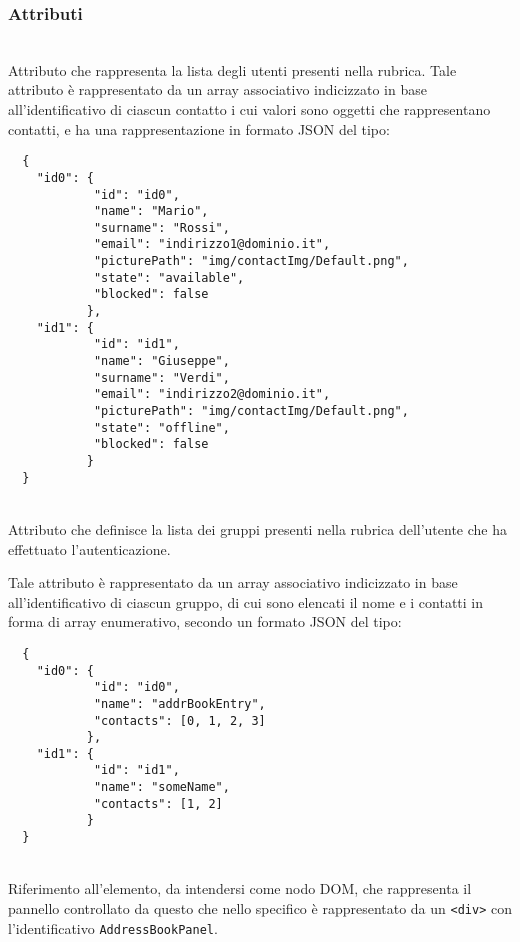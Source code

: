 \subsubsection*{Attributi}
\begin{description}
  
   \item{}\\
  Attributo che rappresenta la lista degli utenti presenti nella rubrica. Tale attributo è rappresentato da un array associativo indicizzato in base all'identificativo di ciascun contatto i cui valori sono oggetti che rappresentano contatti, e ha una rappresentazione in formato JSON del tipo:
  \begin{verbatim}
  {
  	"id0": {
  	        "id": "id0",
  	        "name": "Mario",
  	        "surname": "Rossi",
            "email": "indirizzo1@dominio.it",
            "picturePath": "img/contactImg/Default.png",
            "state": "available",
            "blocked": false
  	       },
  	"id1": {
  	        "id": "id1",
  	        "name": "Giuseppe",
  	        "surname": "Verdi",
            "email": "indirizzo2@dominio.it",
            "picturePath": "img/contactImg/Default.png",
            "state": "offline",
            "blocked": false
  	       }
  }
  \end{verbatim}
  
   \item{}\\
  Attributo che definisce la lista dei gruppi presenti nella rubrica dell'utente che ha effettuato l'autenticazione.
  
  Tale attributo è rappresentato da un array associativo indicizzato in base all'identificativo di ciascun gruppo, di cui sono elencati il nome e i contatti in forma di array enumerativo, secondo un formato JSON del tipo:
  \begin{verbatim}
  {
  	"id0": {
  	        "id": "id0",
  	        "name": "addrBookEntry",
  	        "contacts": [0, 1, 2, 3]
  	       },
  	"id1": {
  	        "id": "id1",
  	        "name": "someName",
  	        "contacts": [1, 2]
  	       }
  }
  \end{verbatim}
  
   \item{}\\
  Riferimento all'elemento, da intendersi come nodo DOM, che rappresenta il pannello controllato da questo  che nello specifico è rappresentato da un \verb'<div>' con l'identificativo \verb'AddressBookPanel'.
  
\end{description}

